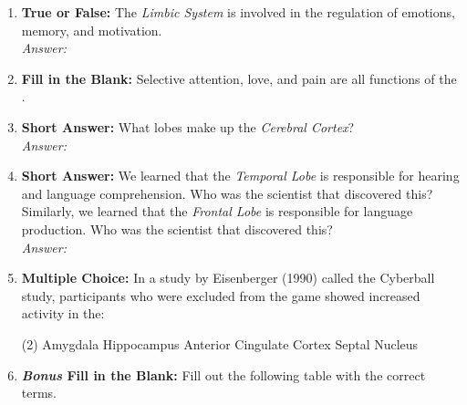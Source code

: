 \begin{enumerate}[label=\textbf{Q1.10.\arabic*}]
      \item \textbf{True or False:} The \textit{Limbic System} is involved in the regulation of emotions, memory, and motivation. \\
            \textit{Answer:} %

      \item \textbf{Fill in the Blank:} Selective attention, love, and pain are all functions of the \underline{\hspace{3cm}}. \\

      \item \textbf{Short Answer:} What lobes make up the \textit{Cerebral Cortex}? \\
            \textit{Answer:} \\%

      \item \textbf{Short Answer:} We learned that the \textit{Temporal Lobe} is responsible for hearing and language comprehension. Who was the scientist that discovered this? Similarly, we learned that the \textit{Frontal Lobe} is responsible for language production. Who was the scientist that discovered this? \\
            \textit{Answer:} \\%

      \item \textbf{Multiple Choice:} In a study by Eisenberger (1990) called the Cyberball study, participants who were excluded from the game showed increased activity in the:
            \begin{tasks}[label=(\Alph*), label-width=1.5em, item-indent=1.7em](2) %
                  \task Amygdala
                  \task Hippocampus
                  \task Anterior Cingulate Cortex
                  \task Septal Nucleus
            \end{tasks}

      \item \textbf{\textit{Bonus} Fill in the Blank:} Fill out the following table with the correct terms.
\end{enumerate}

